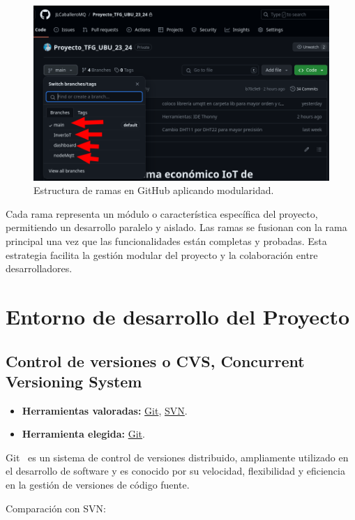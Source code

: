 \begin{figure}[h]
    \centering
    \includegraphics[width=1\textwidth]{img/desarrollo/modularidad.png}
	\caption{Estructura de ramas en GitHub aplicando modularidad. }
\end{figure}
Cada rama representa un módulo o característica específica del proyecto, permitiendo un desarrollo paralelo y aislado. Las ramas se fusionan con la rama principal una vez que las funcionalidades están completas y probadas. Esta estrategia facilita la gestión modular del proyecto y la colaboración entre desarrolladores.

\section{Entorno de desarrollo del Proyecto}
\subsection{Control de versiones o CVS, Concurrent Versioning System}\label{4:controlVersiones}
\begin{itemize}
    \item \textbf{Herramientas valoradas:} \href{https://git-scm.com/}{Git}, \href{https://subversion.apache.org/}{SVN}.
    \item \textbf{Herramienta elegida:} \href{https://git-scm.com/}{Git}.
\end{itemize}
Git~\cite{misc:Git} es un sistema de control de versiones distribuido, ampliamente utilizado en el desarrollo de software y es conocido por su velocidad, flexibilidad y eficiencia en la gestión de versiones de código fuente.

Comparación con SVN:

